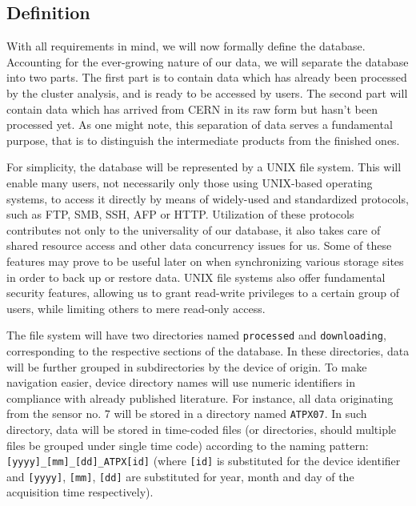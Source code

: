 \subsection{Definition}
\label{db:definition}
With all requirements in mind, we will now formally define the database. Accounting for the ever-growing nature of our data, we will separate the database into two parts. The first part is to contain data which has already been processed by the cluster analysis, and is ready to be accessed by users. The second part will contain data which has arrived from CERN in its raw form but hasn't been processed yet. As one might note, this separation of data serves a fundamental purpose, that is to distinguish the intermediate products from the finished ones.


For simplicity, the database will be represented by a UNIX file system. This will enable many users, not necessarily only those using UNIX-based operating systems, to access it directly by means of widely-used and standardized protocols, such as FTP, SMB, SSH, AFP or HTTP\label{db:supported-protocols}. Utilization of these protocols contributes not only to the universality of our database, it also takes care of shared resource access and other data concurrency issues for us. Some of these features may prove to be useful later on when synchronizing various storage sites in order to back up or restore data. UNIX file systems also offer fundamental security features, allowing us to grant read-write privileges to a certain group of users, while limiting others to mere read-only access.


The file system will have two directories named \texttt{processed} and \texttt{downloading}, corresponding to the respective sections of the database. In these directories, data will be further grouped in subdirectories by the device of origin. To make navigation easier, device directory names will use numeric identifiers in compliance with already published literature. For instance, all data originating from the sensor no. 7 will be stored in a directory named \texttt{ATPX07}. In such directory, data will be stored in time-coded files (or directories, should multiple files be grouped under single time code) according to the naming pattern: \texttt{[yyyy]\_[mm]\_[dd]\_ATPX[id]} (where \texttt{[id]} is substituted for the device identifier and \texttt{[yyyy]}, \texttt{[mm]}, \texttt{[dd]} are substituted for year, month and day of the acquisition time respectively).


